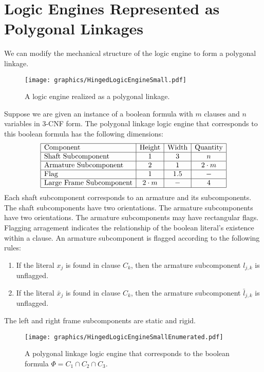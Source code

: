 \section{Logic Engines Represented as Polygonal Linkages}   
We can modify the mechanical structure of the logic engine to form a polygonal linkage.  

\begin{figure}[!htbp]
\begin{center}
\texttt{[image: graphics/HingedLogicEngineSmall.pdf]}
\caption{A logic engine realized as a polygonal linkage.}\label{fig:HingedLogicEngineSmall.pdf}
\end{center}
\end{figure}
Suppose we are given an instance of a boolean formula with $m$ clauses and $n$ variables in 3-CNF form.  
The polygonal linkage logic engine that corresponds to this boolean formula has the following 
dimensions:
$$\begin{array}{|l|c|c|c|}%
 \hline
 \text{Component} & \text{Height} & \text{Width} & \text{Quantity}\\\hline
 \text{Shaft Subcomponent} & 1 & 3 & n\\\hline
 \text{Armature Subcomponent} & 2 & 1 & 2\cdot m\\\hline
 \text{Flag} & 1 & 1.5 & -\\\hline
 \text{Large Frame Subcomponent} & 2\cdot m & - & 4\\\hline
\end{array}$$
Each shaft subcomponent corresponds to an armature and its subcomponents. The shaft subcomponents 
have two orientations.  The armature subcomponents have two orientations.  The armature subcomponents may have rectangular flags. Flagging arragement 
indicates the relationship of the boolean literal's existence within a clause.   An armature 
subcomponent is flagged according to the following rules:
\begin{enumerate}
 \item If the literal $x_j$ is found in clause $C_k$, then the armature subcomponent $l_{j,k}$ is 
unflagged.
 \item If the literal $\bar{x}_j$ is found in clause $C_k$, then the armature 
subcomponent $\bar{l}_{j,k}$ is unflagged.
\end{enumerate}
The left and right frame subcomponents are static and rigid.
\begin{figure}[!htbp]
\begin{center}
\texttt{[image: graphics/HingedLogicEngineSmallEnumerated.pdf]}
\caption{A polygonal linkage logic engine that corresponds to the boolean formula $\Phi = C_1 \cap C_2 \cap C_3$.}\label{fig:HingedLogicEngineSmallEnumerated.pdf}
\end{center}
\end{figure}

